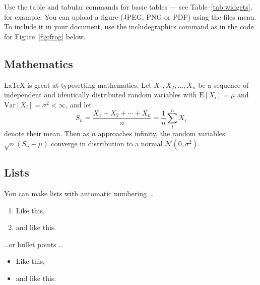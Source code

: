 \documentclass[12pt]{article}
\begin{document}
		Use the table and tabular commands for basic tables --- see Table~\ref{tab:widgets}, for example. You can upload a figure (JPEG, PNG or PDF) using the files menu. To include it in your document, use the includegraphics command as in the code for Figure~\ref{fig:frog} below.
		
		
		
		\subsection{Mathematics}
		
		\LaTeX{} is great at typesetting mathematics. Let $X_1, X_2, \ldots, X_n$ be a sequence of independent and identically distributed random variables with $\text{E}[X_i] = \mu$ and $\text{Var}[X_i] = \sigma^2 < \infty$, and let
		$$S_n = \frac{X_1 + X_2 + \cdots + X_n}{n}
		= \frac{1}{n}\sum_{i}^{n} X_i$$
		denote their mean. Then as $n$ approaches infinity, the random variables $\sqrt{n}(S_n - \mu)$ converge in distribution to a normal $\mathcal{N}(0, \sigma^2)$.
		
		\subsection{Lists}
		
		You can make lists with automatic numbering \dots
		
		\begin{enumerate}
			\item Like this,
			\item and like this.
		\end{enumerate}
		\dots or bullet points \dots
		\begin{itemize}
			\item Like this,
			\item and like this.
		\end{itemize}
	\fi
	
\end{document}
